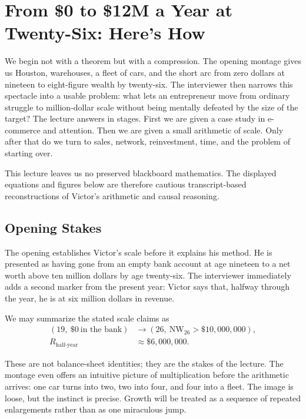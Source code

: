 \chapter{From \$0 to \$12M a Year at Twenty-Six: Here's How}

We begin not with a theorem but with a compression. The opening montage gives us Houston, warehouses, a fleet of cars, and the short arc from zero dollars at nineteen to eight-figure wealth by twenty-six. The interviewer then narrows this spectacle into a usable problem: what lets an entrepreneur move from ordinary struggle to million-dollar scale without being mentally defeated by the size of the target? The lecture answers in stages. First we are given a case study in e-commerce and attention. Then we are given a small arithmetic of scale. Only after that do we turn to sales, network, reinvestment, time, and the problem of starting over.

\begin{remark}
This lecture leaves us no preserved blackboard mathematics. The displayed equations and figures below are therefore cautious transcript-based reconstructions of Victor's arithmetic and causal reasoning.
\end{remark}

\section{Opening Stakes}

The opening establishes Victor's scale before it explains his method. He is presented as having gone from an empty bank account at age nineteen to a net worth above ten million dollars by age twenty-six. The interviewer immediately adds a second marker from the present year: Victor says that, halfway through the year, he is at six million dollars in revenue.

We may summarize the stated scale claims as
\begin{align}
(19,\ \$0\ \text{in the bank}) &\longrightarrow (26,\ \mathrm{NW}_{26} > \$10{,}000{,}000), \\
R_{\text{half-year}} &\approx \$6{,}000{,}000.
\end{align}

These are not balance-sheet identities; they are the stakes of the lecture. The montage even offers an intuitive picture of multiplication before the arithmetic arrives: one car turns into two, two into four, and four into a fleet. The image is loose, but the instinct is precise. Growth will be treated as a sequence of repeated enlargements rather than as one miraculous jump.

